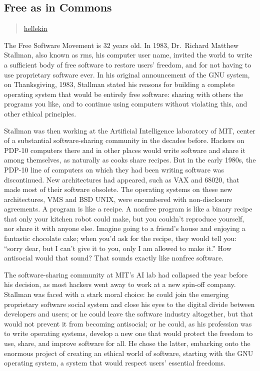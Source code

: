 \subsection{Free as in Commons}\label{free-as-in-commons}

\begin{quote}
\hyperlink{hellekin}{hellekin}
\end{quote}

The Free Software Movement is 32 years old. In 1983, Dr.~Richard Matthew
Stallman, also known as rms, his computer user name, invited the world
to write a sufficient body of free software to restore users' freedom,
and for not having to use proprietary software ever. In his original
announcement of the GNU system, on Thanksgiving, 1983, Stallman stated
his reasons for building a complete operating system that would be
entirely free software: sharing with others the programs you like, and
to continue using computers without violating this, and other ethical
principles.

Stallman was then working at the Artificial Intelligence laboratory of
MIT, center of a substantial software-sharing community in the decades
before. Hackers on PDP-10 computers there and in other places would
write software and share it among themselves, as naturally as cooks
share recipes. But in the early 1980s, the PDP-10 line of computers on
which they had been writing software was discontinued. New architectures
had appeared, such as VAX and 68020, that made most of their software
obsolete. The operating systems on these new architectures, VMS and BSD
UNIX, were encumbered with non-disclosure agreements. A program is like
a recipe. A nonfree program is like a binary recipe that only your
kitchen robot could make, but you couldn't reproduce yourself, nor share
it with anyone else. Imagine going to a friend's house and enjoying a
fantastic chocolate cake; when you'd ask for the recipe, they would tell
you: ``sorry dear, but I can't give it to you, only I am allowed to make
it.'' How antisocial would that sound? That sounds exactly like nonfree
software.

The software-sharing community at MIT's AI lab had collapsed the year
before his decision, as most hackers went away to work at a new spin-off
company. Stallman was faced with a stark moral choice: he could join the
emerging proprietary software social system and close his eyes to the
digital divide between developers and users; or he could leave the
software industry altogether, but that would not prevent it from
becoming antisocial; or he could, as his profession was to write
operating systems, develop a new one that would protect the freedom to
use, share, and improve software for all. He chose the latter, embarking
onto the enormous project of creating an ethical world of software,
starting with the GNU operating system, a system that would respect
users' essential freedoms.

